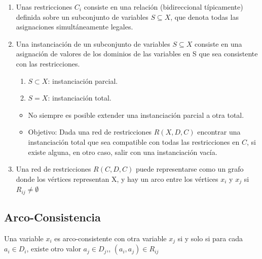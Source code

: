 \documentclass[12pt, twoside, openright]{report} %
\begin{document}
  
\begin{enumerate}
\def\labelenumi{\arabic{enumi}.}
\setcounter{enumi}{1}

\item
  Unas restricciones \(C_i\) consiste en una relación (bidireccional
  típicamente) definida sobre un subconjunto de variables
  \(S \subseteq X\), que denota todas las asignaciones simultáneamente
  legales.

  \item
    Una instanciación de un subconjunto de variables \(S \subseteq X\)
    consiste en una asignación de valores de los dominios de las
    variables en S que sea consistente con las restricciones.

    \begin{enumerate}
  
    \item
      \(S \subset X\): instanciación parcial.
	  \item
    \(S = X\): instanciación total.
    \end{enumerate}
  

    \begin{itemize}
  
    \item
      No siempre es posible extender una instanciación parcial a otra
      total.

	\item
	  Objetivo: Dada una red de restricciones \(R(X, D, C)\) encontrar una
	  instanciación total que sea compatible con todas las restricciones en
	  \(C\), si existe alguna, en otro caso, salir con una instanciación
	  vacía.
    \end{itemize}

	\item
    Una red de restricciones \(R(C, D, C)\) puede representarse como un
    grafo donde los vértices representan X, y hay un arco entre los
    vértices \(x_i\) y \(x_j\) si \(R_{ij} \neq \emptyset\)

\end{enumerate}


\subsection{Arco-Consistencia}

Una variable \(x_i\) es arco-consistente con otra variable \(x_j\) si
  y solo si para cada \(a_i \in D_i\), existe otro valor
  \(a_j \in D_j\),, \((a_i,a_j) \in R_{ij}\)
\end{document}
